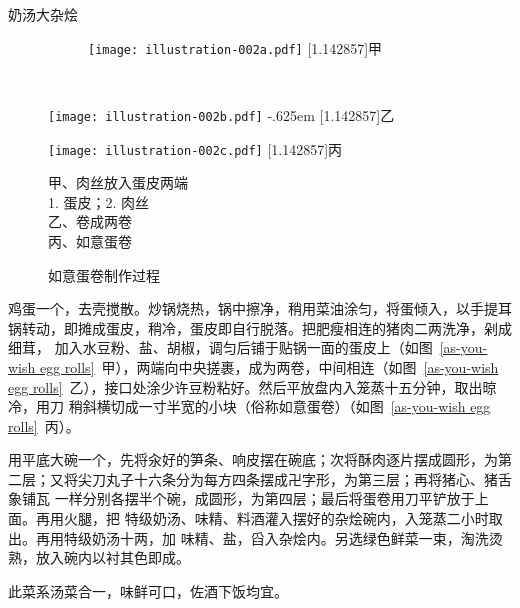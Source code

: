 \begin{recipe}{奶汤大杂烩}
\begin{figure}[h]
%
%
\vspace{-.6875\baselineskip}%
\begin{subfigure}[h]{\linewidth}%
\centering%
\texttt{[image: illustration-002a.pdf]}%
\baselineskip%
\hbox{\fsfamily\scalebox{1}[1.142857]{甲}}%
\end{subfigure}%
\vspace{.3125\baselineskip}%
\\%
\parbox{14.75em}{%
	\hspace{4em}\texttt{[image: illustration-002b.pdf]}%
	\kern-.625em\baselineskip%
	\hbox{\fsfamily\scalebox{1}[1.142857]{乙}}%
}%
\begin{minipage}{11em}
	\vspace{.25\baselineskip}%
	\texttt{[image: illustration-002c.pdf]}%
	\baselineskip%
	\hbox{\fsfamily\scalebox{1}[1.142857]{丙}}%
	\vspace{1.25\baselineskip}%
	\caption{如意蛋卷制作过程}
	\label{as-you-wish egg rolls}
	\vspace{1\baselineskip}%
	\begingroup%
	\small%
	\noindent%
	\null\hspace{1.5em}甲、肉丝放入蛋皮两端\\
	\null\hspace{3.5em}1. 蛋皮；\hspace{.5em}2. 肉丝\\
	\null\hspace{1.5em}乙、卷成两卷\\
	\null\hspace{1.5em}丙、如意蛋卷
	\endgroup
\end{minipage}
\vspace{-.75\baselineskip}%
\end{figure}%
\enlargethispage{-.434674\baselineskip}%

\step 鸡蛋一个，去壳搅散。炒锅烧热，锅中擦净，稍用菜油涂匀，将蛋倾入，以手提耳
锅转动，即摊成蛋皮，稍冷，蛋皮即自行脱落。把肥瘦相连的猪肉二两洗净，剁成细茸，
加入水豆粉、盐、胡椒，调匀后铺于贴锅一面的蛋皮上（如图~\ref{as-you-wish egg
rolls}~甲），两端向中央搓裹，成为两卷，中间相连（如图~\ref{as-you-wish egg
rolls}~乙），接口处涂少许豆粉粘好。然后平放盘内入笼蒸十五分钟，取出晾冷，用刀
稍斜横切成一寸半宽的小块（俗称如意蛋卷）（如图~\ref{as-you-wish egg
rolls}~丙）。

\step 用平底大碗一个，先将汆好的笋条、响皮摆在碗底；次将酥肉逐片摆成圆形，为第
二层；又将尖刀丸子十六条分为每方四条摆成卍字形，为第三层；再将猪心、猪舌象铺瓦
一样分别各摆半个碗，成圆形，为第四层；最后将蛋卷用刀平铲放于上面。再用火腿，把
特级奶汤、味精、料酒灌入摆好的杂烩碗内，入笼蒸二小时取出。再用特级奶汤十两，加
味精、盐，舀入杂烩内。另选绿色鲜菜一束，淘洗烫熟，放入碗内以衬其色即成。

\features

此菜系汤菜合一，味鲜可口，佐酒下饭均宜。

\end{recipe}

